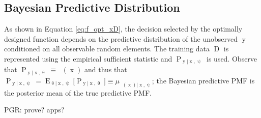 \documentclass{article}
\DeclareMathOperator{\xrm}{\mathrm{x}}
\DeclareMathOperator{\yrm}{\mathrm{y}}
\DeclareMathOperator{\Drm}{\mathrm{D}}
\DeclareMathOperator{\Prm}{\mathrm{P}}
\DeclareMathOperator{\Erm}{\mathrm{E}}
\DeclareMathOperator{\upthetac}{\uptheta_\text{c}}
\begin{document}
\subsection{Bayesian Predictive Distribution}

As shown in Equation \eqref{eq:f_opt_xD}, the decision selected by the optimally designed function depends on the predictive distribution of the unobserved $\yrm$ conditioned on all observable random elements. The training data $\Drm$ is represented using the empirical sufficient statistic and $\Prm_{\yrm | \xrm,\uppsi}$ is used. Observe that $\Prm_{\yrm | \xrm,\uptheta} \equiv \upthetac(\xrm)$ and thus that $\Prm_{\yrm | \xrm,\uppsi} = \Erm_{\uptheta | \xrm,\uppsi}\big[ \Prm_{\yrm | \xrm,\uptheta} \big] \equiv \mu_{\upthetac(\xrm) | \xrm,\uppsi}$; the Bayesian predictive PMF is the posterior mean \cite{murphy} of the true predictive PMF.

PGR: prove? apps?
\end{document}
